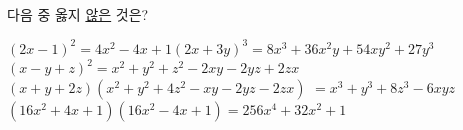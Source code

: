 다음 중 옳지 \underline{않은} 것은?
\begin{choicesv}{$(2x-1)^2=4x^2-4x+1$}{$(2x+3y)^3=8x^3+36x^2y+54xy^2+27y^3$}{$(x-y+z)^2=x^2+y^2+z^2-2xy-2yz+2zx$}{$(x+y+2z)(x^2+y^2+4z^2-xy-2yz-2zx)$ $=x^3+y^3+8z^3-6xyz$}{$(16x^2+4x+1)(16x^2-4x+1)=256x^4+32x^2+1$}\end{choicesv}
